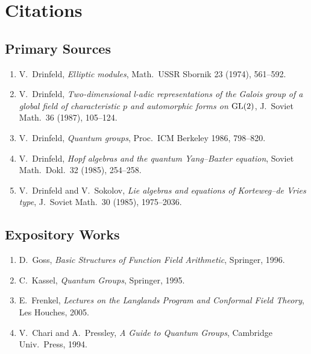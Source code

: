 \section{Citations}\subsection*{Primary Sources}
\begin{enumerate}
    \item V.\ Drinfeld, \textit{Elliptic modules}, Math.\ USSR Sbornik 23 (1974), 561--592.
    \item V.\ Drinfeld, \textit{Two-dimensional l-adic representations of the Galois group of a global field of characteristic $p$ and automorphic forms on $\operatorname{GL}(2)$}, J.\ Soviet Math.\ 36 (1987), 105--124.
    \item V.\ Drinfeld, \textit{Quantum groups}, Proc.\ ICM Berkeley 1986, 798--820.
    \item V.\ Drinfeld, \textit{Hopf algebras and the quantum Yang--Baxter equation}, Soviet Math.\ Dokl.\ 32 (1985), 254--258.
    \item V.\ Drinfeld and V.\ Sokolov, \textit{Lie algebras and equations of Korteweg--de Vries type}, J.\ Soviet Math.\ 30 (1985), 1975--2036.
\end{enumerate}

\subsection*{Expository Works}
\begin{enumerate}
    \item D.\ Goss, \textit{Basic Structures of Function Field Arithmetic}, Springer, 1996.
    \item C.\ Kassel, \textit{Quantum Groups}, Springer, 1995.
    \item E.\ Frenkel, \textit{Lectures on the Langlands Program and Conformal Field Theory}, Les Houches, 2005.
    \item V.\ Chari and A.\ Pressley, \textit{A Guide to Quantum Groups}, Cambridge Univ.\ Press, 1994.
\end{enumerate}

